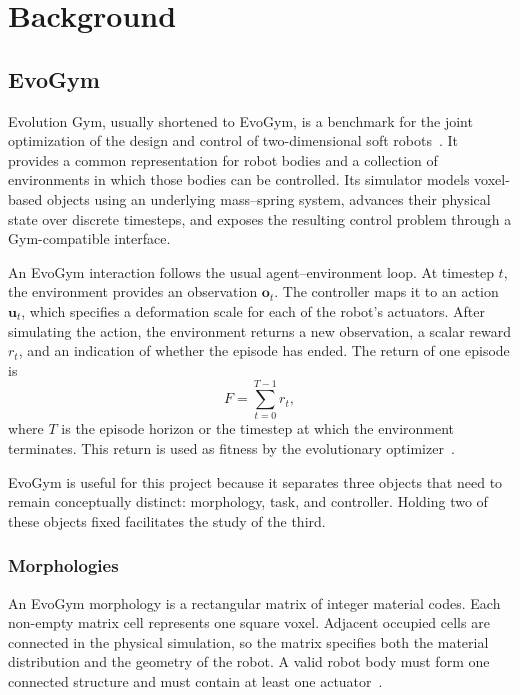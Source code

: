 \chapter{Background}
\label{cha:background}

\section{EvoGym}

Evolution Gym, usually shortened to EvoGym, is a benchmark for the joint optimization of the design and control of two-dimensional soft robots~\cite{bhatia2021evolution}. It provides a common representation for robot bodies and a collection of environments in which those bodies can be controlled. Its simulator models voxel-based objects using an underlying mass--spring system, advances their physical state over discrete timesteps, and exposes the resulting control problem through a Gym-compatible interface.

An EvoGym interaction follows the usual agent--environment loop. At timestep $t$, the environment provides an observation $\mathbf{o}_t$. The controller maps it to an action $\mathbf{u}_t$, which specifies a deformation scale for each of the robot's actuators. After simulating the action, the environment returns a new observation, a scalar reward $r_t$, and an indication of whether the episode has ended. The return of one episode is
\begin{equation}
  F = \sum_{t=0}^{T-1} r_t,
  \label{eq:return}
\end{equation}
where $T$ is the episode horizon or the timestep at which the environment terminates. This return is used as fitness by the evolutionary optimizer~\cite{bhatia2021evolution}.

EvoGym is useful for this project because it separates three objects that need to remain conceptually distinct: morphology, task, and controller. Holding two of these objects fixed facilitates the study of the third.

\subsection{Morphologies}

An EvoGym morphology is a rectangular matrix of integer material codes. Each non-empty matrix cell represents one square voxel. Adjacent occupied cells are connected in the physical simulation, so the matrix specifies both the material distribution and the geometry of the robot. A valid robot body must form one connected structure and must contain at least one actuator~\cite{bhatia2021evolution}.

